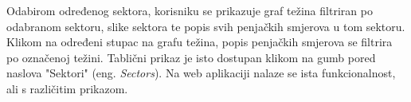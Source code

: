 Odabirom određenog sektora, korisniku se prikazuje graf težina filtriran po odabranom sektoru, slike sektora te popis svih penjačkih smjerova u tom sektoru. Klikom na određeni stupac na grafu težina, popis penjačkih smjerova se filtrira po označenoj težini. Tablični prikaz je isto dostupan klikom na gumb pored naslova "Sektori" (eng. \textit{Sectors}). Na web aplikaciji nalaze se ista funkcionalnost, ali s različitim prikazom.



